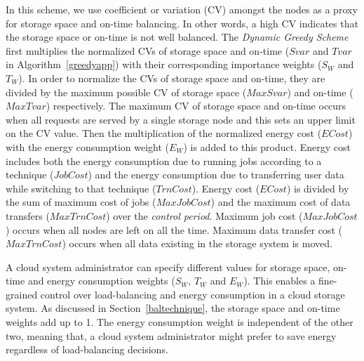 \documentclass[preprint,12pt]{elsarticle}
\begin{document}
In this scheme, we use coefficient or variation (CV) amongst the nodes as a proxy for storage space
and on-time balancing.
In other words, a high CV indicates that the storage
space or on-time is not well balanced.
The \textit{Dynamic Greedy Scheme} first multiplies the normalized CVs of storage space
and on-time ($Svar$ and $Tvar$ in Algorithm~\ref{greedyapp}) with their corresponding importance
weights ($S_W$ and $T_W$). In order to normalize the CVs of storage space and on-time, they are
divided by the maximum possible CV of storage space ($MaxSvar$) and on-time
($MaxTvar$) respectively. The maximum CV of storage space and on-time occurs when all requests
are served by a single storage node and this sets an upper limit on the CV value. Then the multiplication
of the normalized energy cost ($ECost$) with the energy consumption weight ($E_W$) is added to this product. Energy
cost includes both the energy consumption due to running jobs according to a technique ($JobCost$) and the energy
consumption due to transferring user data while switching to that technique ($TrnCost$). Energy cost ($ECost$) is
divided by the sum of maximum cost of jobs ($MaxJobCost$) and the maximum cost of data transfers ($MaxTrnCost$) over the 
\textit{control period}. Maximum job cost ($MaxJobCost$) occurs when all nodes are left on all the time. Maximum data
transfer cost ($MaxTrnCost$) occurs when all data existing in the storage system is moved.

A cloud system administrator can specify different values for storage space, on-time and energy consumption
weights ($S_W$, $T_W$ and $E_W$). This enables a fine-grained control over load-balancing and energy consumption
in a cloud storage system. As discussed in Section~\ref{baltechnique}, the storage space
and on-time weights add up to 1. The energy consumption weight is independent of the other two, meaning that,
a cloud system administrator might prefer to save energy regardless of load-balancing decisions. 
\end{document}
